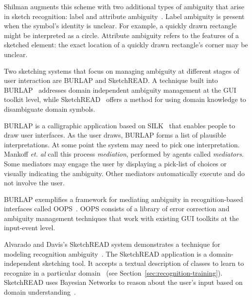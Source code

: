 Shilman augments this scheme with two additional types of ambiguity
that arise in sketch recognition: label and attribute
ambiguity~\cite{shilman-parsing}. Label ambiguity is present when the
symbol's identity is unclear. For example, a quickly drawn rectangle
might be interpreted as a circle. Attribute ambiguity refers to the
features of a sketched element: the exact location of a quickly drawn
rectangle's corner may be unclear.

Two sketching systems that focus on managing ambiguity at different
stages of user interaction are BURLAP and SketchREAD. A technique
built into BURLAP~\cite{mankoff-burlap} addresses domain independent
ambiguity management at the GUI toolkit level, while
SketchREAD~\cite{alvarado-sketchread-uist} offers a method for using
domain knowledge to disambiguate domain symbols.

BURLAP is a calligraphic application based on SILK~\cite{landay-silk}
that enables people to draw user interfaces. As the user draws, BURLAP
forms a list of plausible interpretations. At some point the system
may need to pick one interpretation.  Mankoff \textit{et. al} call
this process \textit{mediation}, performed by agents
called \textit{mediators}. Some mediators may engage the user by
displaying a pick-list of choices or visually indicating the
ambiguity. Other mediators automatically execute and do not involve
the user.

BURLAP exemplifies a framework for mediating ambiguity in
recognition-based interfaces called OOPS~\cite{mankoff-oops}. OOPS
consists of a library of error correction and ambiguity management
techniques that work with existing GUI toolkits at the input-event
level.

Alvarado and Davis's SketchREAD system demonstrates a technique for
modeling recognition ambiguity~\cite{alvarado-sketchread-uist}. The
SketchREAD application is a domain-independent sketching tool. It
accepts a textual description of classes to learn to recognize in a
particular domain~\cite{hammond-ladder} (see
Section~\ref{sec:recognition-training}). SketchREAD uses Bayesian
Networks to reason about the user's input based on domain
understanding~\cite{alvarado-dynamic-bayes}.

